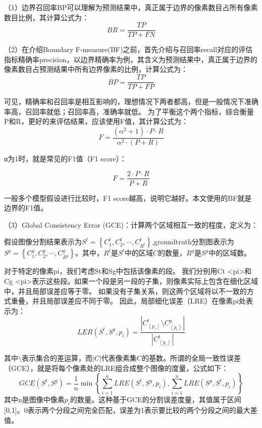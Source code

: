 （1）边界召回率BP可以理解为预测结果中，真正属于边界的像素数目占所有像素数目比例，其计算公式为：
\begin{equation}
BR = \frac{TP}{TP+FN}
\end{equation}

（2）在介绍Boundary F-measure(BF)之前，首先介绍与召回率recall对应的评估指标精确率precision，以边界精确率为例，其含义为预测结果中，真正属于边界的像素数目占预测结果中所有边界像素的比例，计算公式为：
\begin{equation}
BP = \frac{TP}{TP+FP}
\end{equation}

可见，精确率和召回率是相互影响的，理想情况下两者都高，但是一般情况下准确率高，召回率就低；召回率高，准确率就低。
为了平衡这个两个指标，综合衡量P和R，更好的来评估结果，应该使用F值，其计算公式为：
\begin{equation}
F=\frac{(\alpha^{2}+1)\cdot P\cdot R }{\alpha^{2}\cdot(P+R)}
\end{equation}

α为1时，就是常见的F1值（F1 score）：

\begin{equation}
F=\frac{2 \cdot P\cdot R }{P+R}
\end{equation}

一般多个模型假设进行比较时，F1 score越高，说明它越好。本文使用的BF就是边界的F1值。

（3）Global Consistency Error (GCE)：计算两个区域相互一致的程度，定义为：

假设图像分割结果表示为$S^{t} = \left \{ C_{1}^{t},C_{2}^{t},\cdots ,C_{R^{t}}^{t} \right \}$,groundtruth分割图表示为
$S^{g} = \left \{ C_{1}^{g},C_{2}^{g},\cdots ,C_{R^{g}}^{g} \right \}$。其中，$R^{t}$是$S^{t}$中的区域$C$的数量，$R^{g}$是$S^{g}$中的区域数。

对于特定的像素pi，我们考虑St和Sg中包括该像素的段。 我们分别用Ct <pi>和Cg <pi>表示这些段。如果一个段是另一段的子集，则像素实际上包含在细化区域中，并且局部误差应等于零。 如果没有子集关系，则这两个区域将以不一致的方式重叠，并且局部误差应不同于零。 因此，局部细化误差（LRE）在像素pi处表示为：
\begin{equation}
LER(S^{t},S^{g},p_{i}) = \frac{\left | C_{\left \langle p_{i}\right \rangle}^{t} \setminus
C_{\left \langle p_{i}\right \rangle}^{g}   \right |}{\left | C_{\left \langle p_{i}\right \rangle}^{t}\right |}
\end{equation}

其中$\setminus $表示集合的差运算，而$|C|$代表像素集C的基数。所谓的全局一致性误差（GCE），就是将每个像素处的LRE组合成整个图像的度量，公式如下：
\begin{equation}
GCE(S^{t},S^{g})=\frac{1}{n}\min \left \{ \sum_{i=1}^{n}LRE(S^{t},S^{g},p_i),\sum_{i=1}^{n}LRE(S^{g},S^{t},p_i)     \right \}
\end{equation}
其中n是图像中像素$p_i$的数量。这种基于GCE的分割误差度量，其值属于区间[0,1]。0表示两个分段之间完全匹配，误差为1表示要比较的两个分段之间的最大差值。

